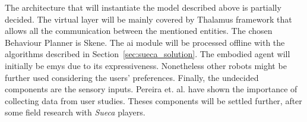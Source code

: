 The architecture that will instantiate the model described above is partially decided.
The virtual layer will be mainly covered by Thalamus framework that allows all the communication between the mentioned entities.
The chosen Behaviour Planner is Skene.
The \gls{ai} module will be processed offline with the algorithms described in Section~\ref{sec:sueca_solution}.
The embodied agent will initially be \gls{emys} due to its expressiveness.
Nonetheless other robots might be further used considering the users' preferences.
Finally, the undecided components are the sensory inputs.
Pereira et. al. have shown the importance of collecting data from user studies.
Theses components will be settled further, after some field research with \emph{Sueca} players.









